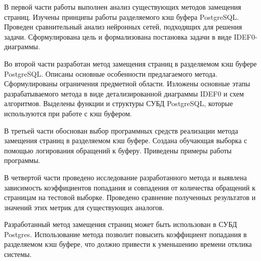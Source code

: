 В первой части работы выполнен анализ существующих методов замещения страниц. 
Изучены принципы работы разделяемого кэш буфера PostgreSQL.
Проведен сравнительный анализ нейронных сетей, подходящих для решения задачи.
Сформулирована цель и формализована постановка задачи в виде IDEF0-диаграммы.

Во второй части разработан метод замещения страниц в разделяемом кэш буфере PostgreSQL.
Описаны основные особенности предлагаемого метода.
Сформулированы ограничения предметной области.
Изложены основные этапы разрабатываемого метода в виде детализированной диаграммы IDEF0 и схем алгоритмов.
Выделены функции и структуры СУБД PostgreSQL, которые используются при работе с кэш буфером.

В третьей части обоснован выбор программных средств реализации метода замещения страниц в разделяемом кэш буфере.
Создана обучающая выборка с помощью логирования обращений к буферу. 
Приведены примеры работы программы. 

В четвертой части проведено исследование разработанного метода и выявлена зависимость коэффициентов попадания и совпадения от количества обращений к страницам на тестовой выборке.
Проведено сравнение полученных результатов и значений этих метрик для существующих аналогов.

Разработанный метод замещения страниц может быть использован в СУБД Postgres. 
Использование метода позволит повысить коэффициент попадания в разделяемом кэш буфере, что должно привести к уменьшению времени отклика системы. 